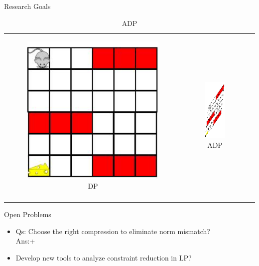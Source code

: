 \documentclass[10pt,handout]{beamer}
\begin{document}
\begin{frame}[fragile]{Research Goals}
\begin{table}
\begin{tabular}{ccc}

\begin{minipage}{0.3\textwidth}
\begin{figure}
\includegraphics[scale=0.2]{mouse-single.png}
\caption*{DP}
\end{figure}
\end{minipage}
&
\begin{minipage}{0.3\textwidth}
\begin{figure}
\includegraphics[scale=0.2]{compress-mouse.png}
\caption*{ADP}
\end{figure}
\end{minipage}
&
\begin{minipage}{0.3\textwidth}
{\color{orange}{$\norm{J^*-J_{\tu}}$}}\\
\end{minipage}
\end{tabular}
\end{table}
\begin{block}{Open Problems}
\begin{itemize}
\item Qs: Choose the right compression to eliminate norm mismatch?\\
{Ans:\color{teal}{$\minp$ linear basis}}+ \cite{melo2007q}
\item Develop new tools to analyze constraint reduction in LP?
\end{itemize}
\end{block}
\end{frame}
\end{document}
